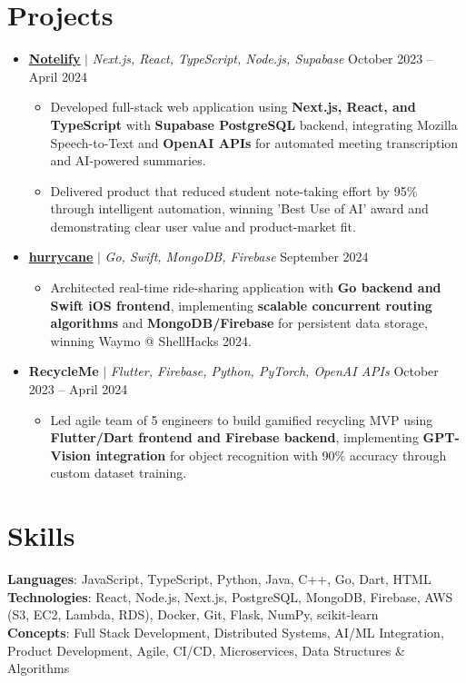 \documentclass[letterpaper,11pt]{article}
\newcommand{\resumeItem}[1]{
  \item\small{
    {#1 \vspace{-2pt}}
  }
}
\newcommand{\resumeProjectHeading}[2]{
  \item
  \small#1 \hfill #2 \\
  \vspace{-7pt} %
}
\newcommand{\resumeSubHeadingListStart}{\begin{itemize}[leftmargin=0.15in, label={}]}
\newcommand{\resumeSubHeadingListEnd}{\end{itemize}}
\newcommand{\resumeItemListStart}{\begin{itemize}}
\newcommand{\resumeItemListEnd}{\end{itemize}\vspace{-5pt}}
\begin{document}
\section{Projects}
    \resumeSubHeadingListStart
      \resumeProjectHeading
          {\underline{\textbf {\href{https://www.notelify.co/}{Notelify}}} $|$ \emph{Next.js, React, TypeScript, Node.js, Supabase}}{October 2023 -- April 2024}
          \resumeItemListStart
            \resumeItem{Developed full-stack web application using \textbf{Next.js, React, and TypeScript} with \textbf{Supabase PostgreSQL} backend, integrating Mozilla Speech-to-Text and \textbf{OpenAI APIs} for automated meeting transcription and AI-powered summaries.}
            \resumeItem{Delivered product that reduced student note-taking effort by 95\% through intelligent automation, winning 'Best Use of AI' award and demonstrating clear user value and product-market fit.}
          \resumeItemListEnd
    \resumeProjectHeading
          {\underline{\textbf {\href{https://github.com/keshavbabu/shellhacks/tree/main}{hurrycane}}} $|$ \emph{Go, Swift, MongoDB, Firebase}}{September 2024}
          \resumeItemListStart
            \resumeItem{Architected real-time ride-sharing application with \textbf{Go backend and Swift iOS frontend}, implementing \textbf{scalable concurrent routing algorithms} and \textbf{MongoDB/Firebase} for persistent data storage, winning Waymo @ ShellHacks 2024.}
          \resumeItemListEnd
      \resumeProjectHeading
          {\textbf{RecycleMe} $|$ \emph{Flutter, Firebase, Python, PyTorch, OpenAI APIs}}{October 2023 -- April 2024}
          \resumeItemListStart
            \resumeItem{Led agile team of 5 engineers to build gamified recycling MVP using \textbf{Flutter/Dart frontend and Firebase backend}, implementing \textbf{GPT-Vision integration} for object recognition with 90\% accuracy through custom dataset training.}
          \resumeItemListEnd
    \resumeSubHeadingListEnd

\section{Skills}
 \begin{itemize}[leftmargin=0.15in, label={}]
    \small{\item{
     \textbf{Languages}{: JavaScript, TypeScript, Python, Java, C++, Go, Dart, HTML} \\
     \textbf{Technologies}{: React, Node.js, Next.js, PostgreSQL, MongoDB, Firebase, AWS (S3, EC2, Lambda, RDS), Docker, Git, Flask, NumPy, scikit-learn} \\
     \textbf{Concepts}{: Full Stack Development, Distributed Systems, AI/ML Integration, Product Development, Agile, CI/CD, Microservices, Data Structures \& Algorithms} }}
 \end{itemize}
 
%
\end{document}
